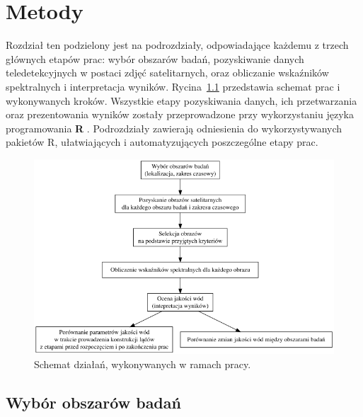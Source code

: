 \documentclass{amuthesis}
\begin{document}

\hypertarget{sec-metody}{%
\chapter{Metody}\label{sec-metody}}

Rozdział ten podzielony jest na podrozdziały, odpowiadające każdemu z
trzech głównych etapów prac: wybór obszarów badań, pozyskiwanie danych
teledetekcyjnych w postaci zdjęć satelitarnych, oraz obliczanie
wskaźników spektralnych i interpretacja wyników.
Rycina~\ref{fig-flowchart} przedstawia schemat prac i wykonywanych
kroków. Wszystkie etapy pozyskiwania danych, ich przetwarzania oraz
prezentowania wyników zostały przeprowadzone przy wykorzystaniu języka
programowania \textbf{R} \autocite{R-base}. Podrozdziały zawierają
odniesienia do wykorzystywanych pakietów R, ułatwiających i
automatyzujących poszczególne etapy prac.

\begin{figure}[t]

{\centering \includegraphics[width=5.20833in,height=\textheight]{figures/flowchart.png}

}

\caption{\label{fig-flowchart}Schemat działań, wykonywanych w ramach
pracy.}

\end{figure}

\hypertarget{wybuxf3r-obszaruxf3w-badaux144}{%
\section{Wybór obszarów badań}\label{wybuxf3r-obszaruxf3w-badaux144}}
\end{document}
